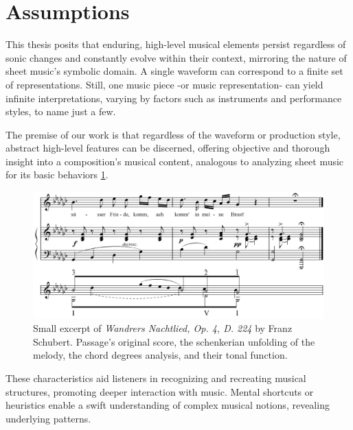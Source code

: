 \section{Assumptions}

This thesis posits that enduring, high-level musical elements persist regardless of sonic changes and constantly evolve within their context, mirroring the nature of sheet music's symbolic domain. A single waveform can correspond to a finite set of representations. Still, one music piece -or music representation- can yield infinite interpretations, varying by factors such as instruments and performance styles, to name just a few.

The premise of our work is that regardless of the waveform or production style, abstract high-level features can be discerned, offering objective and thorough insight into a composition's musical content, analogous to analyzing sheet music for its basic behaviors \ref{fig:Wandrers Nachtlied, Op. 4, D. 224}.


\begin{figure}[ht]
\includegraphics[clip,width=\columnwidth]{figures/schenkerian analysis/SchubertOp4no3.png}%
\caption[Excerpt of \textit{Wandrers Nachtlied, Op. 4, D. 224} by Franz Schubert.]{\small{Small excerpt of \textit{Wandrers Nachtlied, Op. 4, D. 224} by Franz Schubert. Passage's original score, the schenkerian unfolding of the melody, the chord degrees analysis, and their tonal function.}}
\label{fig:Wandrers Nachtlied, Op. 4, D. 224}
\end{figure}


These characteristics aid listeners in recognizing and recreating musical structures, promoting deeper interaction with music. Mental shortcuts or heuristics enable a swift understanding of complex musical notions, revealing underlying patterns.

